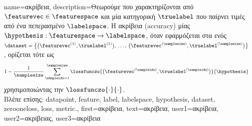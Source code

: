 {name={\foreignlanguage{greek}{ακρίβεια}},
	description={\foreignlanguage{greek}{Θεωρούμε} 
		 \foreignlanguage{greek}{που χαρακτηρίζονται από}  $\featurevec \in \featurespace$ 
		\foreignlanguage{greek}{και μία κατηγορική} 
		$\truelabel$ \foreignlanguage{greek}{που παίρνει τιμές από ένα πεπερασμένο}  $\labelspace$. 
		\foreignlanguage{greek}{Η ακρίβεια} (accuracy) \foreignlanguage{greek}{μίας}  
		$\hypothesis: \featurespace \rightarrow \labelspace$, \foreignlanguage{greek}{όταν εφαρμόζεται στα}  
		 \foreignlanguage{greek}{ενός}  
		$\dataset = \big\{ \big(\featurevec^{(1)}, \truelabel^{(1)} \big), \,\ldots, \,\big(\featurevec^{(\samplesize)},\truelabel^{(\samplesize)}\big) \big\}$, 
		\foreignlanguage{greek}{ορίζεται τότε ως} 
		$$1 - \frac{1}{\samplesize} \sum_{\sampleidx=1}^{\samplesize} \lossfunczo{\big(\featurevec^{(\sampleidx)},\truelabel^{(\sampleidx)}\big)}{\hypothesis}$$ 
		\foreignlanguage{greek}{χρησιμοποιώντας την}  $\lossfunczo{\cdot}{\cdot}$.
		\\
		\foreignlanguage{greek}{Βλέπε επίσης:} \gls{datapoint}, \gls{feature}, \gls{label}, \gls{labelspace}, \gls{hypothesis}, \gls{dataset}, 
		\gls{zerooneloss}, \gls{loss}, \gls{metric}.},
	first={\foreignlanguage{greek}{ακρίβεια}},
	text={\foreignlanguage{greek}{ακρίβεια}},
	user1={\foreignlanguage{greek}{ακρίβεια}}, %
	user2={\foreignlanguage{greek}{ακρίβειας}}, %
	user3={\foreignlanguage{greek}{ακρίβεια}} %
}

